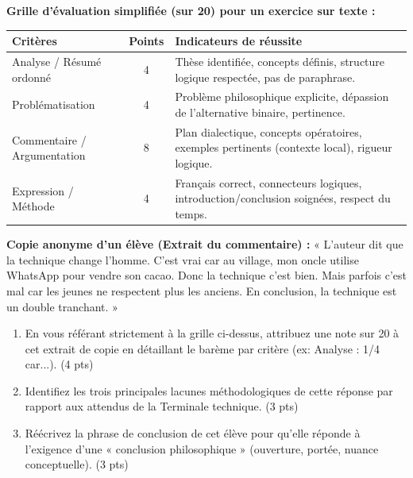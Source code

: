 \documentclass[11pt]{article}
\begin{document}
\begin{exercice}
\textbf{Grille d'évaluation simplifiée (sur 20) pour un exercice sur texte :}
\begin{center}
\begin{tabular}{|l|c|p{6cm}|}
\hline
\textbf{Critères} & \textbf{Points} & \textbf{Indicateurs de réussite} \\
\hline
Analyse / Résumé ordonné & 4 & Thèse identifiée, concepts définis, structure logique respectée, pas de paraphrase. \\
\hline
Problématisation & 4 & Problème philosophique explicite, dépassion de l'alternative binaire, pertinence. \\
\hline
Commentaire / Argumentation & 8 & Plan dialectique, concepts opératoires, exemples pertinents (contexte local), rigueur logique. \\
\hline
Expression / Méthode & 4 & Français correct, connecteurs logiques, introduction/conclusion soignées, respect du temps. \\
\hline
\end{tabular}
\end{center}
\textbf{Copie anonyme d'un élève (Extrait du commentaire) :}
« L'auteur dit que la technique change l'homme. C'est vrai car au village, mon oncle utilise WhatsApp pour vendre son cacao. Donc la technique c'est bien. Mais parfois c'est mal car les jeunes ne respectent plus les anciens. En conclusion, la technique est un double tranchant. »

\begin{enumerate}
    \item En vous référant strictement à la grille ci-dessus, attribuez une note sur 20 à cet extrait de copie en détaillant le barème par critère (ex: Analyse : 1/4 car...). (4 pts)
    \item Identifiez les trois principales lacunes méthodologiques de cette réponse par rapport aux attendus de la Terminale technique. (3 pts)
    \item Réécrivez la phrase de conclusion de cet élève pour qu'elle réponde à l'exigence d'une « conclusion philosophique » (ouverture, portée, nuance conceptuelle). (3 pts)
\end{enumerate}
\end{exercice}
\end{document}
